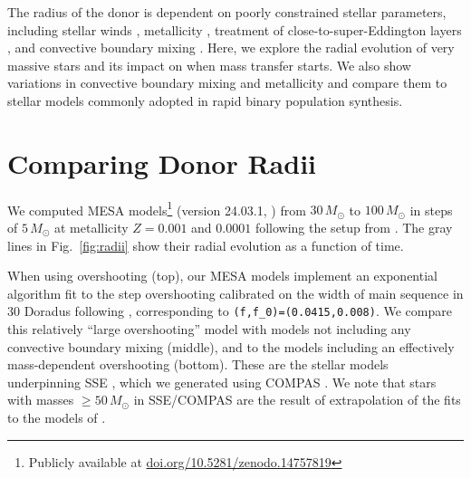 \documentclass[twocolumn]{aastex63}
\DeclareRobustCommand{\Figref}[1]{Fig.~\ref{#1}}
\begin{document}
The radius of the donor is dependent on poorly constrained stellar
parameters, including stellar winds \citep{renzo:17, josiek:24},
metallicity \citep{xin:22}, treatment of
close-to-super-Eddington layers \citep[e.g.,][]{joss:73, paxton:13,
  jiang:15, agrawal:22, jermyn:23}, and convective boundary mixing
\citep{anders:23, johnston:24}. Here, we explore the radial evolution
of very massive stars and its impact on when mass transfer starts. We
also show variations in convective boundary mixing and metallicity and
compare them to stellar models commonly adopted in rapid binary
population synthesis.

\section{Comparing Donor Radii}

We computed \textsc{MESA} models\footnote{Publicly available at
  \href{https://doi.org/10.5281/zenodo.14757819}{doi.org/10.5281/zenodo.14757819}}
(version 24.03.1, \citealt{paxton:11, paxton:13, paxton:15, paxton:18,
  paxton:19, jermyn:23}) from $30 \, M_{\odot}$ to $100 \, M_{\odot}$
in steps of $5\,M_\odot$ at metallicity $Z=0.001$ and $0.0001$
following the setup from \cite{renzo:23}. The gray lines in
\Figref{fig:radii} show their radial evolution as a function of time.

When using overshooting (top), our \textsc{MESA} models implement an
exponential algorithm \citep{herwig:00} fit to the step overshooting
calibrated on the width of main sequence in 30 Doradus
\citep[$\sim{}0.335$ pressure scale heights,][]{brott:11} following
\cite{claret:18}, corresponding to
\texttt{(f,f\_0)=(0.0415,0.008)}. We compare this relatively ``large
overshooting'' model with models not including any convective boundary
mixing (middle), and to the \cite{pols:98} models including an
effectively mass-dependent overshooting (bottom). These are the
stellar models underpinning \textsc{SSE} \citep{hurley:00}, which we
generated using \textsc{COMPAS} \citep{stevenson:17, vignagomez:18,
  riley:22}. We note that stars with masses $\geq50\,M_\odot$ in
\textsc{SSE}/\textsc{COMPAS} are the result of extrapolation of the
fits to the models of \cite{pols:98}.
\end{document}
